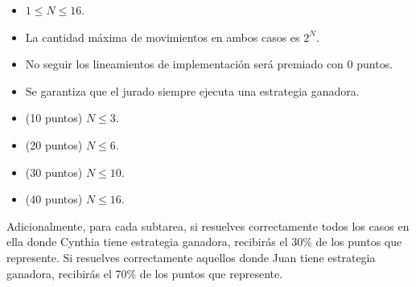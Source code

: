 \documentclass[12pt]{scrartcl}
\begin{document}

        \begin{itemize}
            \item $1 \le N \le 16$.
            \item La cantidad máxima de movimientos en ambos casos es $2^N$.
            \item No seguir los lineamientos de implementación será premiado con 0 puntos.
            \item Se garantiza que el jurado siempre ejecuta una estrategia ganadora.
        \end{itemize}


    
        \begin{itemize}
            \item (10 puntos) $N \le 3$.
            \item (20 puntos) $N \le 6$.
            \item (30 puntos) $N \le 10$.
            \item (40 puntos) $N \le 16$.
        \end{itemize}

        Adicionalmente, para cada subtarea, si resuelves correctamente todos los casos en ella donde Cynthia tiene estrategia ganadora, recibirás el 30\% de los puntos que represente. Si resuelves correctamente aquellos donde Juan tiene estrategia ganadora, recibirás el 70\% de los puntos que represente.
    
        

    
    
\end{document}
